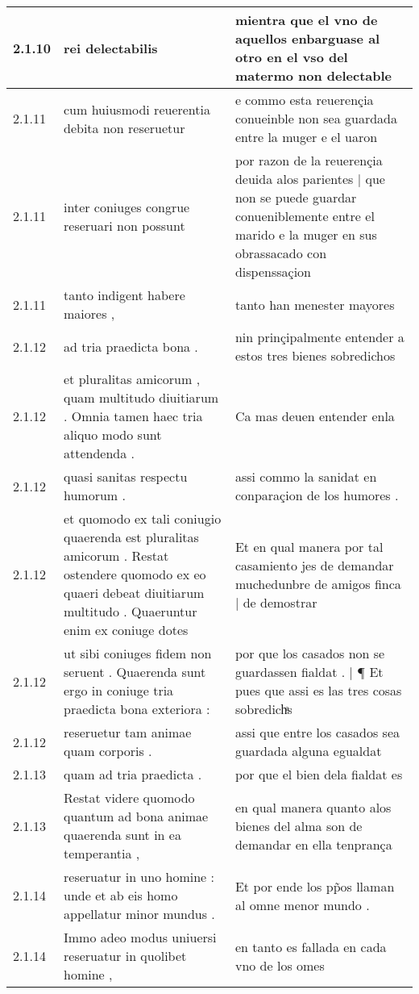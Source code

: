\begin{tabular}{|p{1cm}|p{6.5cm}|p{6.5cm}|}
2.1.10 & rei delectabilis & mientra que el vno de aquellos enbarguase al otro en el vso del matermo non delectable \\\hline
2.1.11 & cum huiusmodi reuerentia debita non reseruetur & e commo esta reuerençia conueinble non sea guardada entre la muger e el uaron \\\hline
2.1.11 & inter coniuges congrue reseruari non possunt & por razon de la reuerençia deuida alos parientes | que non se puede guardar conueniblemente entre el marido e la muger en sus obrassacado con dispenssaçion \\\hline
2.1.11 & tanto indigent habere maiores , & tanto han menester mayores \\\hline
2.1.12 & ad tria praedicta bona . & nin prinçipalmente entender a estos tres bienes sobredichos \\\hline
2.1.12 & et pluralitas amicorum , quam multitudo diuitiarum . Omnia tamen haec tria aliquo modo sunt attendenda . & Ca mas deuen entender enla \\\hline
2.1.12 & quasi sanitas respectu humorum . & assi commo la sanidat en conparaçion de los humores . \\\hline
2.1.12 & et quomodo ex tali coniugio quaerenda est pluralitas amicorum . Restat ostendere quomodo ex eo quaeri debeat diuitiarum multitudo . Quaeruntur enim ex coniuge dotes & Et en qual manera por tal casamiento jes de demandar muchedunbre de amigos finca | de demostrar \\\hline
2.1.12 & ut sibi coniuges fidem non seruent . Quaerenda sunt ergo in coniuge tria praedicta bona exteriora : & por que los casados non se guardassen fialdat . | ¶ Et pues que assi es las tres cosas sobredichͣs \\\hline
2.1.12 & reseruetur tam animae quam corporis . & assi que entre los casados sea guardada alguna egualdat \\\hline
2.1.13 & quam ad tria praedicta . & por que el bien dela fialdat es \\\hline
2.1.13 & Restat videre quomodo quantum ad bona animae quaerenda sunt in ea temperantia , & en qual manera quanto alos bienes del alma son de demandar en ella tenprança \\\hline
2.1.14 & reseruatur in uno homine : unde et ab eis homo appellatur minor mundus . & Et por ende los pp̃os llaman al omne menor mundo . \\\hline
2.1.14 & Immo adeo modus uniuersi reseruatur in quolibet homine , & en tanto es fallada en cada vno de los omes \\\hline

\end{tabular}
